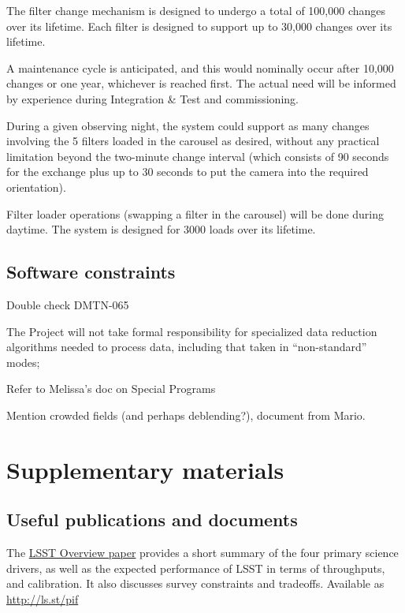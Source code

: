 \documentclass[DM,lsstdraft,toc,usenatbib]{lsstdoc}
\begin{document}
The filter change mechanism is designed to undergo a total of 100,000 changes over its lifetime. Each filter is designed to support up to 30,000 changes over its lifetime.

A maintenance cycle is anticipated, and this would nominally occur after 10,000 changes or one year, whichever is reached first. The actual need will be informed by experience during Integration \& Test and commissioning.

During a given observing night, the system could support as many changes involving the 5 filters loaded in the carousel as desired, without any practical limitation beyond the two-minute change interval (which consists of 90 seconds for the exchange plus up to 30 seconds to put the camera into the required orientation). 

Filter loader operations (swapping a filter in the carousel) will be done during daytime. The system is designed for 3000 loads over its lifetime. 




\subsection{Software constraints} 

Double check DMTN-065

The Project will not take formal responsibility for specialized data reduction algorithms 
needed to process data, including that taken in ``non-standard'' modes; 
   
Refer to Melissa's doc on Special Programs 

Mention crowded fields (and perhaps deblending?), document from Mario. 



\section{Supplementary materials} 


\subsection{Useful publications and documents}

The \href{https://www.lsst.org/content/lsst-science-drivers-reference-design-and-anticipated-data-products}{LSST Overview paper} provides a short summary of the four primary science drivers, as well as the expected performance of LSST in terms of throughputs, and calibration. 
It also discusses survey constraints and tradeoffs.  Available as \url{http://ls.st/pif}
\end{document}
